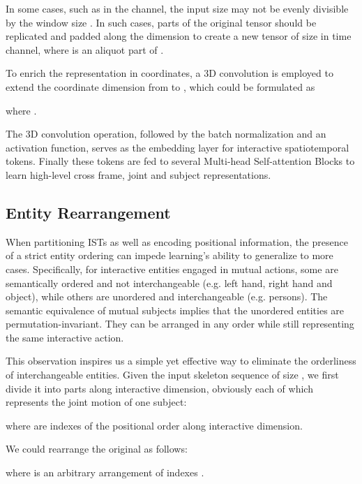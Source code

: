 \documentclass[letterpaper, 10 pt, conference]{ieeeconf}
\begin{document}
In some cases, such as in the  channel, the input size  may not be evenly divisible by the window size . In such cases, parts of the original tensor should be replicated and padded along the  dimension to create a new tensor of size  in time channel, where  is an aliquot part of .

To enrich the representation in coordinates, a 3D  convolution is employed to extend the coordinate dimension from  to , which could be formulated as

where .

The 3D convolution operation, followed by the batch normalization and an activation function, serves as the embedding layer for interactive spatiotemporal tokens. Finally these tokens  are fed to several Multi-head Self-attention Blocks to learn high-level cross frame, joint and subject representations.

\subsection{Entity Rearrangement}
When partitioning ISTs as well as encoding positional information, the presence of a strict entity ordering can impede learning's ability to generalize to more cases. Specifically, for interactive entities engaged in mutual actions, some are semantically ordered and not interchangeable (e.g. left hand, right hand and object), while others are unordered and interchangeable (e.g. persons). The semantic equivalence of mutual subjects implies that the unordered entities are permutation-invariant. They can be arranged in any order while still representing the same interactive action.

This observation inspires us a simple yet effective way to eliminate the orderliness of interchangeable entities. Given the input skeleton sequence of size , we first divide it into  parts along interactive dimension, obviously each of which represents the joint motion of one subject:

where  are indexes of the positional order along interactive dimension.

We could rearrange the original  as follows:

where  is an arbitrary arrangement of indexes .
\end{document}
